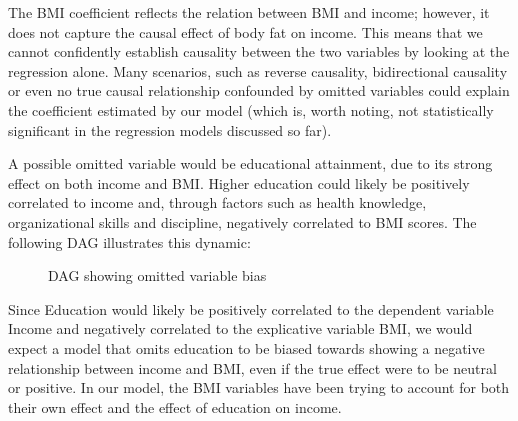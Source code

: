 \newpage



The BMI coefficient reflects the relation between BMI and income; however, it does not capture the causal effect of body fat on income. This means that we cannot confidently establish causality between the two variables by looking at the regression alone. Many scenarios, such as reverse causality, bidirectional causality or even no true causal relationship confounded by omitted variables could explain the coefficient estimated by our model (which is, worth noting, not statistically significant in the regression models discussed so far).


A possible omitted variable would be educational attainment, due to its strong effect on both income and BMI. Higher education could likely be positively correlated to income and, through factors such as health knowledge, organizational skills and discipline, negatively correlated to BMI scores. The following DAG illustrates this dynamic:

\begin{figure}[H]
    \centering
    \caption{DAG showing omitted variable bias}
    \label{fig:dag}
\end{figure}


Since Education would likely be positively correlated to the dependent variable Income and negatively correlated to the explicative variable BMI, we would expect a model that omits education to be biased towards showing a negative relationship between income and BMI, even if the true effect were to be neutral or positive. In our model, the BMI variables have been trying to account for both their own effect and the effect of education on income.

